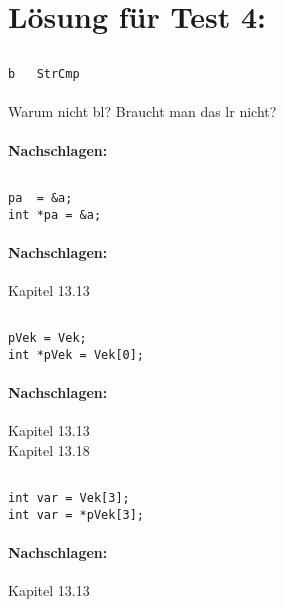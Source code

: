 
\section{Lösung für Test 4:}

\subsection{}
\begin{lstlisting}
b	StrCmp
\end{lstlisting}
\paragraph{} Warum nicht bl? Braucht man das lr nicht?
\paragraph*{Nachschlagen:}

\subsection{}
\begin{lstlisting}
pa	= &a;
int *pa = &a;
\end{lstlisting}
\paragraph*{Nachschlagen:}
Kapitel 13.13

\subsection{}
\begin{lstlisting}
pVek = Vek;
int *pVek = Vek[0];
\end{lstlisting}
\paragraph*{Nachschlagen:}
Kapitel 13.13\\
Kapitel 13.18

\subsection{}
\begin{lstlisting}
int var = Vek[3];
int var = *pVek[3];
\end{lstlisting}
\paragraph*{Nachschlagen:}
Kapitel 13.13

